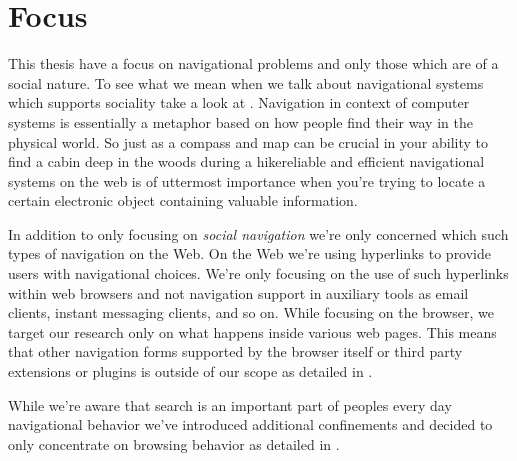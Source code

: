 \section{Focus}

This thesis have a focus on navigational problems and only those
which are of a social nature. To see what we mean when we talk about
navigational systems which supports sociality take a look at
.
Navigation in context of computer systems is
essentially a metaphor based on how people find their way in the physical
world. So just as a compass and map can be crucial in your ability to find a
cabin deep in the woods during a hike\dash{}reliable and efficient
navigational systems on the web is of uttermost importance when you're trying
to locate a certain electronic object containing valuable information.


In addition to only focusing on \emph{social navigation} we're only concerned
which such types of navigation on the Web.
On the Web we're using hyperlinks \citep[p.~90]{nelson65} to provide users
with navigational choices. We're only focusing on the use of such hyperlinks
within web browsers and not navigation support in auxiliary tools as email
clients, instant messaging clients, and so on. While focusing on the browser,
we target our research only on what happens inside various web pages. This
means that other navigation forms supported by the browser itself or third
party extensions or plugins is outside of our scope as detailed in
.

While we're aware that search is an important part of peoples every day
navigational behavior we've introduced additional confinements and decided to
only concentrate on browsing behavior as detailed in
.

